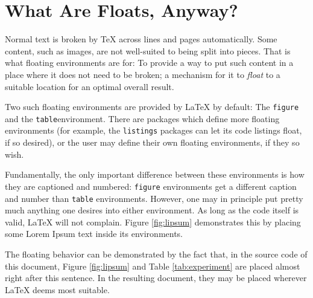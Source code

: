 \documentclass[article,a4paper,oneside,10pt]{memoir}
\begin{document}
\newpage
\chapter{What Are Floats, Anyway?}
\label{chap:what-are-floats}

Normal text  is broken  by \TeX{} across  lines and  pages automatically. Some
content, such as images, are not  well-suited to being split into pieces. That
is what floating environments are for: To provide a way to put such content in
a  place  where  it does  not  need  to  be  broken;  a mechanism  for  it  to
\emph{float} to a suitable location for an optimal overall result.

Two  such  floating environments  are  provided  by \LaTeX{}  by  default: The
\verb|figure|   and  the   \verb|table|\footnotemark  environment. There   are
packages   which  define   more  floating   environments  (for   example,  the
\verb|listings| packages can  let its code listings float, if  so desired), or
the user may define their own floating environments, if they so wish.


Fundamentally, the only important difference between these environments is how
they are  captioned and numbered:  \verb|figure| environments get  a different
caption  and  number  than  \verb|table|  environments. However,  one  may  in
principle put  pretty much  anything one  desires into  either environment. As
long  as  the  code  itself  is  valid,  \LaTeX{}  will  not  complain. Figure
\ref{fig:lipsum} demonstrates this by placing some Lorem Ipsum text inside its
environments.

The floating behavior can be demonstrated by the fact that, in the source code
of this  document, Figure \ref{fig:lipsum} and  Table \ref{tab:experiment} are
placed almost right  after this sentence. In the resulting  document, they may
be placed  wherever \LaTeX{}  deems most  suitable\footnotemark.

\end{document}
